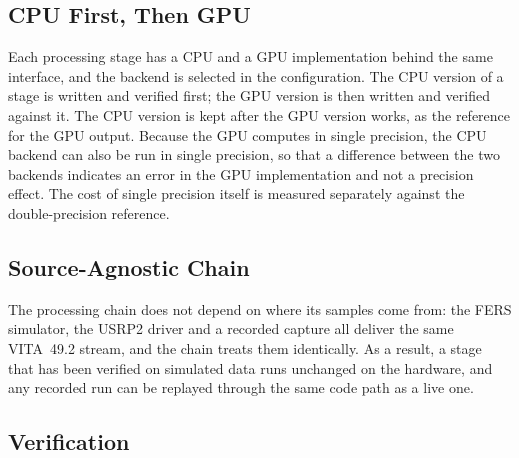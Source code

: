 \begin{figure}[H]
    \centering
    \caption[TODO]{}
    \label{fig:ch3.increments}
\end{figure}

\subsection{CPU First, Then GPU}
\label{subsec:ch3.philosophy.cpugpu}

Each processing stage has a CPU and a GPU implementation behind the same interface, and the backend is selected in the configuration. The CPU version of a stage is written and verified first; the GPU version is then written and verified against it. The CPU version is kept after the GPU version works, as the reference for the GPU output. Because the GPU computes in single precision, the CPU backend can also be run in single precision, so that a difference between the two backends indicates an error in the GPU implementation and not a precision effect. The cost of single precision itself is measured separately against the double-precision reference.

\subsection{Source-Agnostic Chain}
\label{subsec:ch3.philosophy.source}

The processing chain does not depend on where its samples come from: the FERS simulator, the USRP2 driver and a recorded capture all deliver the same VITA~49.2 stream, and the chain treats them identically. As a result, a stage that has been verified on simulated data runs unchanged on the hardware, and any recorded run can be replayed through the same code path as a live one.

\subsection{Verification}
\label{subsec:ch3.verification}
\label{subsec:ch3.verification.golden}

